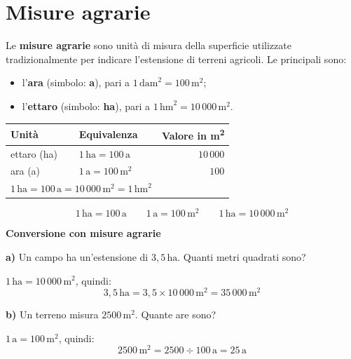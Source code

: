 \section{Misure agrarie}

\begin{definizione}
    Le \textbf{misure agrarie} sono unità di misura della superficie utilizzate tradizionalmente per indicare l'estensione di terreni agricoli. Le principali sono:
    \begin{itemize}[noitemsep]
        \item l'\textbf{ara} (simbolo: \textbf{a}), pari a $1\,\text{dam}^2 = 100\,\text{m}^2$;
        \item l'\textbf{ettaro} (simbolo: \textbf{ha}), pari a $1\,\text{hm}^2 = 10\,000\,\text{m}^2$.
    \end{itemize}
\end{definizione}

\begin{center}
    \begin{tabular}{llr}
        \toprule
        \textbf{Unità}                                                                            & \textbf{Equivalenza}            & \textbf{Valore in m\textsuperscript{2}} \\
        \midrule
        ettaro (ha)                                                                               & $1\,\text{ha} = 100\,\text{a}$  & $10\,000$                               \\
        ara (a)                                                                                   & $1\,\text{a} = 100\,\text{m}^2$ & $100$                                   \\
        \midrule
        \multicolumn{2}{l}{$1\,\text{ha} = 100\,\text{a} = 10\,000\,\text{m}^2 = 1\,\text{hm}^2$} &                                                                           \\
        \bottomrule
    \end{tabular}
\end{center}

\begin{regola}
    \[
        1\,\text{ha} = 100\,\text{a} \qquad 1\,\text{a} = 100\,\text{m}^2 \qquad 1\,\text{ha} = 10\,000\,\text{m}^2
    \]
\end{regola}

\begin{esempio}
    \textbf{Conversione con misure agrarie}

    \medskip
    \textbf{a)} Un campo ha un'estensione di $3{,}5\,\text{ha}$. Quanti metri quadrati sono?

    $1\,\text{ha} = 10\,000\,\text{m}^2$, quindi:
    \[
        3{,}5\,\text{ha} = 3{,}5 \times 10\,000\,\text{m}^2 = 35\,000\,\text{m}^2
    \]

    \medskip
    \textbf{b)} Un terreno misura $2500\,\text{m}^2$. Quante are sono?

    $1\,\text{a} = 100\,\text{m}^2$, quindi:
    \[
        2500\,\text{m}^2 = 2500 \div 100\,\text{a} = 25\,\text{a}
    \]
\end{esempio}

